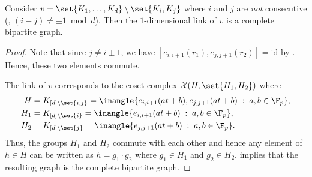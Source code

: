 \documentclass{toc}
\begin{document}
\begin{observation}
  Consider $v = \set{K_1,\ldots, K_d} \setminus \set{K_i,K_j}$ where $i$ and $j$ are \emph{not} consecutive (\ie, $(i-j) \neq \pm 1 \bmod d$). Then the $1$-dimensional link of $v$ is a complete bipartite graph.
\end{observation}
\begin{proof}
  Note that since $j \neq i\pm 1$, we have $[e_{i,i+1}(r_1), e_{j,j+1}(r_2)] = \mathrm{id}$ by . Hence, these two elements commute.

  The link of $v$ corresponds to the coset complex $\mathcal{X}(H,\set{H_1,H_2})$ where
  \begin{align*}
    H & = K_{[d]\setminus\set{i,j}} =  \inangle{e_{i,i+1}(at+b),e_{j,j+1}(at+b) \;:\; a,b\in \F_p},\\
    H_1 & = K_{[d]\setminus\set{i}} =  \inangle{e_{i,i+1}(at+b) \;:\; a,b\in \F_p},\\
    H_2 & = K_{[d]\setminus\set{j}} =  \inangle{e_{j,j+1}(at+b) \;:\; a,b\in \F_p}.
  \end{align*}
  Thus, the groups $H_1$ and $H_2$ commute with each other and hence any element of $h\in H$ can be written as $h = g_1 \cdot g_2$ where $g_1 \in H_1$ and $g_2 \in H_2$.  implies that the resulting graph is the complete bipartite graph.    
\end{proof}
\end{document}

